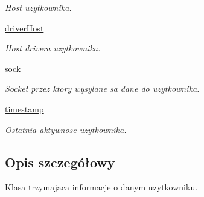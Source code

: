 \begin{DoxyCompactItemize}
\begin{DoxyCompactList}\small\item\em Host uzytkownika. \item\end{DoxyCompactList}\item 
\hypertarget{class_serv_1_1_user_1_1_user_a7beeb2284a00949cec3e6012ec84b07b}{
\hyperlink{class_serv_1_1_user_1_1_user_a7beeb2284a00949cec3e6012ec84b07b}{driverHost}}
\label{class_serv_1_1_user_1_1_user_a7beeb2284a00949cec3e6012ec84b07b}

\begin{DoxyCompactList}\small\item\em Host drivera uzytkownika. \item\end{DoxyCompactList}\item 
\hypertarget{class_serv_1_1_user_1_1_user_a1b29d91b1e55fb1089921d3dbceaf5db}{
\hyperlink{class_serv_1_1_user_1_1_user_a1b29d91b1e55fb1089921d3dbceaf5db}{sock}}
\label{class_serv_1_1_user_1_1_user_a1b29d91b1e55fb1089921d3dbceaf5db}

\begin{DoxyCompactList}\small\item\em Socket przez ktory wysylane sa dane do uzytkownika. \item\end{DoxyCompactList}\item 
\hypertarget{class_serv_1_1_user_1_1_user_a4361ad465bc018dd14f11d50bf0adad5}{
\hyperlink{class_serv_1_1_user_1_1_user_a4361ad465bc018dd14f11d50bf0adad5}{timestamp}}
\label{class_serv_1_1_user_1_1_user_a4361ad465bc018dd14f11d50bf0adad5}

\begin{DoxyCompactList}\small\item\em Ostatnia aktywnosc uzytkownika. \item\end{DoxyCompactList}\end{DoxyCompactItemize}


\subsection{Opis szczegółowy}
\begin{DoxyVerb}Klasa trzymajaca informacje o danym uzytkowniku.\end{DoxyVerb}
 


